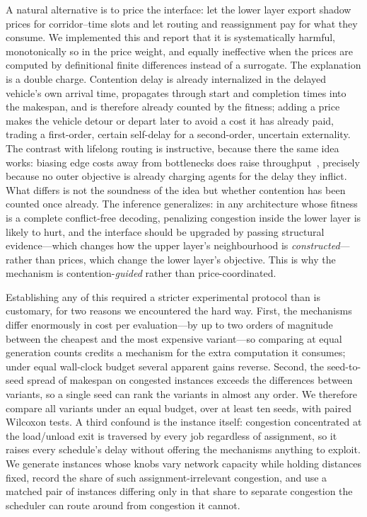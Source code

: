 \documentclass[manuscript,screen,review]{acmart}
\begin{document}
A natural alternative is to price the interface: let the lower layer export
shadow prices for corridor--time slots and let routing and reassignment pay for
what they consume. We implemented this and report that it is systematically
harmful, monotonically so in the price weight, and equally ineffective when the
prices are computed by definitional finite differences instead of a surrogate.
The explanation is a double charge. Contention delay is already internalized in
the delayed vehicle's own arrival time, propagates through start and completion
times into the makespan, and is therefore already counted by the fitness; adding
a price makes the vehicle detour or depart later to avoid a cost it has already
paid, trading a first-order, certain self-delay for a second-order, uncertain
externality. The contrast with lifelong routing is instructive, because there the
same idea works: biasing edge costs away from bottlenecks does raise
throughput~\cite{zhang2024guidance}, precisely because no outer objective is
already charging agents for the delay they inflict. What differs is not the
soundness of the idea but whether contention has been counted once
already. The inference generalizes: in any architecture whose fitness is a
complete conflict-free decoding, penalizing congestion inside the lower layer is
likely to hurt, and the interface should be upgraded by passing structural
evidence---which changes how the upper layer's neighbourhood is
\emph{constructed}---rather than prices, which change the lower layer's
objective. This is why the mechanism is contention-\emph{guided} rather than
price-coordinated.

Establishing any of this required a stricter experimental protocol than is
customary, for two reasons we encountered the hard way. First, the mechanisms
differ enormously in cost per evaluation---by up to two orders of magnitude
between the cheapest and the most expensive variant---so comparing at equal
generation counts credits a mechanism for the extra computation it consumes;
under equal wall-clock budget several apparent gains reverse. Second, the
seed-to-seed spread of makespan on congested instances exceeds the differences
between variants, so a single seed can rank the variants in almost any order. We
therefore compare all variants under an equal budget, over at least ten seeds,
with paired Wilcoxon tests. A third confound is the instance itself: congestion
concentrated at the load/unload exit is traversed by every job regardless of
assignment, so it raises every schedule's delay without offering the mechanisms
anything to exploit. We generate instances whose knobs vary network capacity
while holding distances fixed, record the share of such assignment-irrelevant
congestion, and use a matched pair of instances differing only in that share to
separate congestion the scheduler can route around from congestion it cannot.
\end{document}
